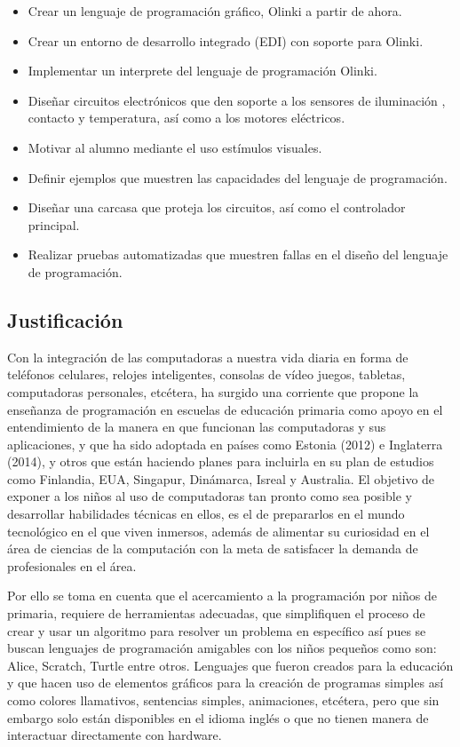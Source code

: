 \documentclass[letterpaper,10pt]{article}
\begin{document}
\begin{itemize}
 \item Crear un lenguaje de programación gráfico, Olinki a partir de ahora.
 \item Crear un entorno de desarrollo integrado (EDI) con soporte para Olinki.
 \item Implementar un interprete del lenguaje de programación Olinki.
 \item Diseñar circuitos electrónicos que den soporte a los sensores de iluminación
 , contacto y temperatura, así como a los motores eléctricos.
 \item Motivar al alumno mediante el uso estímulos visuales.
 \item Definir ejemplos que muestren las capacidades del lenguaje de programación.
 \item Diseñar una carcasa que proteja los circuitos, así como el controlador 
 principal.
 \item Realizar pruebas automatizadas que muestren fallas en el diseño del lenguaje 
 de programación.
\end{itemize}

\subsection{Justificación}

Con la integración de las computadoras a nuestra vida diaria en forma de teléfonos celulares,
 relojes inteligentes, consolas de vídeo juegos, tabletas, computadoras personales, 
 etcétera, ha surgido una corriente 
que propone la enseñanza de programación en escuelas de educación primaria como apoyo
en el entendimiento de la manera en que funcionan las computadoras y sus aplicaciones, y que ha
sido adoptada en países como Estonia (2012) e Inglaterra (2014), y otros que están 
haciendo planes para incluirla en su plan de estudios como 
Finlandia, EUA, Singapur, Dinámarca, Isreal y Australia. El objetivo de exponer a los niños
al uso de computadoras tan pronto como sea posible y desarrollar habilidades técnicas en ellos,
es el de prepararlos en el mundo tecnológico en el que viven inmersos, además
 de alimentar su curiosidad en el área de ciencias de la computación con la meta de 
 satisfacer la demanda de profesionales en el área.\newline 

Por ello se toma en cuenta que el acercamiento a la programación por niños de primaria, 
requiere de herramientas adecuadas,
que simplifiquen el proceso de crear y usar un algoritmo para resolver un problema en específico 
así pues se buscan lenguajes de programación amigables con los niños pequeños como son:
Alice, Scratch, Turtle entre otros. Lenguajes que fueron creados para la educación y que 
hacen uso de elementos gráficos para la creación de programas simples así como colores llamativos,
sentencias simples, animaciones, etcétera, pero que sin embargo solo están disponibles en el
idioma inglés o que no tienen manera de interactuar directamente con hardware.\newline
\end{document}
